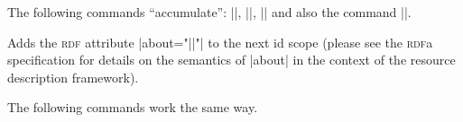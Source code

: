 The following commands ``accumulate'': |\pgfrdfproperty|, |\pgfrdfrel|,
|\pgfrdfrev| and also the command |\pgfrdftypeof|.

\begin{command}{\pgfrdfabout{}}
    Adds the \textsc{rdf} attribute |about="||"| to the next id
    scope (please see the \textsc{rdf}a specification for details on the
    semantics of |about| in the context of the resource description framework).
\end{command}

The following commands work the same way.

\begin{command}{\pgfrdfcontent{}}
\end{command}

\begin{command}{\pgfrdfdatatype{}}
\end{command}

\begin{command}{\pgfrdfhref{}}
\end{command}

\begin{command}{\pgfrdfinlist}
\end{command}

\begin{command}{\pgfrdfprefix{}}
\end{command}

\begin{command}{\pgfrdfproperty{}}
\end{command}

\begin{command}{\pgfrdfrel{}}
\end{command}

\begin{command}{\pgfrdfresource{}}
\end{command}

\begin{command}{\pgfrdfrev{}}
\end{command}

\begin{command}{\pgfrdfsrc{}}
\end{command}

\begin{command}{\pgfrdftypeof{}}
\end{command}

\begin{command}{\pgfrdfvocab{}}
\end{command}


